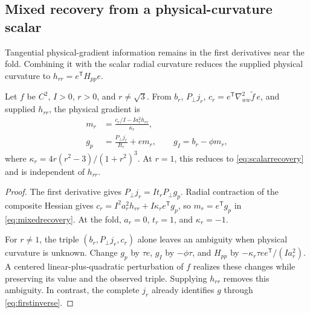 \subsection{Mixed recovery from a physical-curvature scalar}
Tangential physical-gradient information remains in the first derivatives near the fold. Combining it with the scalar radial curvature reduces the supplied physical curvature to $h_{rr}=e^{\mathsf T}H_{pp}e$.
\begin{proposition}
\label{prop:mixed}
Let $f$ be $C^2$, $I>0$, $r>0$, and $r\ne\sqrt3$. From $b_r$, $P_\perp j_r$, $c_r=e^{\mathsf T}\nabla^2_{ww}\widetilde f\,e$, and supplied $h_{rr}$, the physical gradient is
\begin{equation}
 \begin{aligned}
 m_r&=\frac{c_r/I-Ia_r^2h_{rr}}{\kappa_r},\\
 g_p&=\frac{P_\perp j_r}{It_r}+e m_r,\qquad
 g_I=b_r-\phi m_r,
 \end{aligned}
 \label{eq:mixedrecovery}
\end{equation}
where $\kappa_r=4r(r^2-3)/(1+r^2)^3$. At $r=1$, this reduces to \eqref{eq:scalarrecovery} and is independent of $h_{rr}$.
\end{proposition}
\begin{proof}
The first derivative gives $P_\perp j_r=It_rP_\perp g_p$. Radial contraction of the composite Hessian gives $c_r=I^2a_r^2h_{rr}+I\kappa_r e^{\mathsf T}g_p$, so $m_r=e^{\mathsf T}g_p$ in \eqref{eq:mixedrecovery}. At the fold, $a_r=0$, $t_r=1$, and $\kappa_r=-1$.

For $r\ne1$, the triple $(b_r,P_\perp j_r,c_r)$ alone leaves an ambiguity when physical curvature is unknown. Change $g_p$ by $\tau e$, $g_I$ by $-\phi\tau$, and $H_{pp}$ by $-\kappa_r\tau ee^{\mathsf T}/(Ia_r^2)$. A centered linear-plus-quadratic perturbation of $f$ realizes these changes while preserving its value and the observed triple. Supplying $h_{rr}$ removes this ambiguity. In contrast, the complete $j_r$ already identifies $g$ through \eqref{eq:firstinverse}.
\end{proof}

